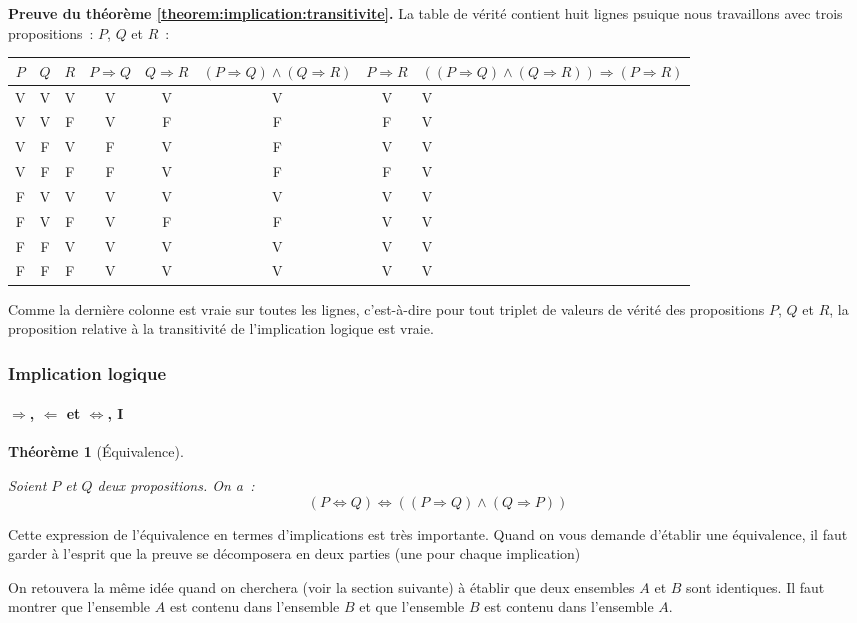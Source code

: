 \documentclass[10pt,notheorems]{beamer}
\theoremstyle{plain}
\newtheorem{theorem}{Théorème}
\theoremstyle{definition} %
\begin{document}
\begin{notes}
  \textbf{Preuve du théorème \hyperlink{slide_implication_transitivite}{\ref{theorem:implication:transitivite}}.}
  La table de vérité contient huit lignes psuique nous travaillons
  avec trois propositions~: $P$, $Q$ et $R$~:

  \begin{table}[H]
    \begin{tabular}[H]{|ccc|ccccg|}
      \hline
      $P$ & $Q$ & $R$ & $P\Rightarrow Q$ & $Q\Rightarrow R$ & $(P\Rightarrow Q) \land (Q\Rightarrow R)$ & $P\Rightarrow R$ & $((P\Rightarrow Q) \land (Q\Rightarrow R))\Rightarrow (P\Rightarrow R)$\\ \hline
      V & V & V & V & V & V & V & V \\
      V & V & F & V & F & F & F & V \\
      V & F & V & F & V & F & V & V \\
      V & F & F & F & V & F & F & V \\
      F & V & V & V & V & V & V & V \\
      F & V & F & V & F & F & V & V \\
      F & F & V & V & V & V & V & V \\
      F & F & F & V & V & V & V & V \\
      \hline\hline
    \end{tabular}
  \end{table}

  Comme la dernière colonne est vraie sur toutes les lignes,
  c'est-à-dire pour tout triplet de valeurs de vérité des propositions
  $P$, $Q$ et $R$, la proposition relative à la transitivité de
  l'implication logique est vraie.
\end{notes}


\begin{frame}
  \frametitle{Implication logique}
  \framesubtitle{$\Rightarrow$, $\Leftarrow$ et $\Leftrightarrow$, I}
  \hypertarget{slide_implication_et_equivalence_1}{}

  \begin{theorem}[Équivalence]\label{theorem:implication:equivalence}

    Soient $P$ et $Q$ deux propositions. On a~:
    \[
      (P\Leftrightarrow Q) \Leftrightarrow ((P\Rightarrow Q) \land
      (Q\Rightarrow P))
    \]
  \end{theorem}

  \bigskip

  Cette expression de l'équivalence en termes d'implications est très
  importante. Quand on vous demande d'établir une équivalence, il faut
  garder à l'esprit que la preuve se décomposera en deux parties (une
  pour chaque implication)\newline

  On retouvera la même idée quand on cherchera (voir la section
  suivante) à établir que deux ensembles $A$ et $B$ sont
  identiques. Il faut montrer que l'ensemble $A$ est contenu dans
  l'ensemble $B$ et que l'ensemble $B$ est contenu dans l'ensemble
  $A$.\newline

\end{frame}
\end{document}
